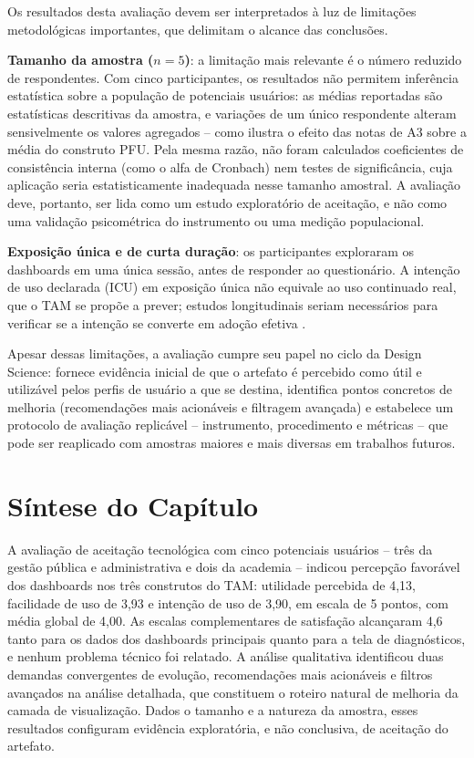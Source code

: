 Os resultados desta avaliação devem ser interpretados à luz de limitações metodológicas importantes, que delimitam o alcance das conclusões.

\textbf{Tamanho da amostra ($n=5$)}: a limitação mais relevante é o número reduzido de respondentes. Com cinco participantes, os resultados não permitem inferência estatística sobre a população de potenciais usuários: as médias reportadas são estatísticas descritivas da amostra, e variações de um único respondente alteram sensivelmente os valores agregados -- como ilustra o efeito das notas de A3 sobre a média do construto PFU. Pela mesma razão, não foram calculados coeficientes de consistência interna (como o alfa de Cronbach) nem testes de significância, cuja aplicação seria estatisticamente inadequada nesse tamanho amostral. A avaliação deve, portanto, ser lida como um estudo exploratório de aceitação, e não como uma validação psicométrica do instrumento ou uma medição populacional.

\textbf{Exposição única e de curta duração}: os participantes exploraram os dashboards em uma única sessão, antes de responder ao questionário. A intenção de uso declarada (ICU) em exposição única não equivale ao uso continuado real, que o TAM se propõe a prever; estudos longitudinais seriam necessários para verificar se a intenção se converte em adoção efetiva \cite{venkatesh2000}.

Apesar dessas limitações, a avaliação cumpre seu papel no ciclo da Design Science: fornece evidência inicial de que o artefato é percebido como útil e utilizável pelos perfis de usuário a que se destina, identifica pontos concretos de melhoria (recomendações mais acionáveis e filtragem avançada) e estabelece um protocolo de avaliação replicável -- instrumento, procedimento e métricas -- que pode ser reaplicado com amostras maiores e mais diversas em trabalhos futuros.

\section{Síntese do Capítulo}
\label{sec:sintese-validacao}

A avaliação de aceitação tecnológica com cinco potenciais usuários -- três da gestão pública e administrativa e dois da academia -- indicou percepção favorável dos dashboards nos três construtos do TAM: utilidade percebida de 4,13, facilidade de uso de 3,93 e intenção de uso de 3,90, em escala de 5 pontos, com média global de 4,00. As escalas complementares de satisfação alcançaram 4,6 tanto para os dados dos dashboards principais quanto para a tela de diagnósticos, e nenhum problema técnico foi relatado. A análise qualitativa identificou duas demandas convergentes de evolução, recomendações mais acionáveis e filtros avançados na análise detalhada, que constituem o roteiro natural de melhoria da camada de visualização. Dados o tamanho e a natureza da amostra, esses resultados configuram evidência exploratória, e não conclusiva, de aceitação do artefato.
